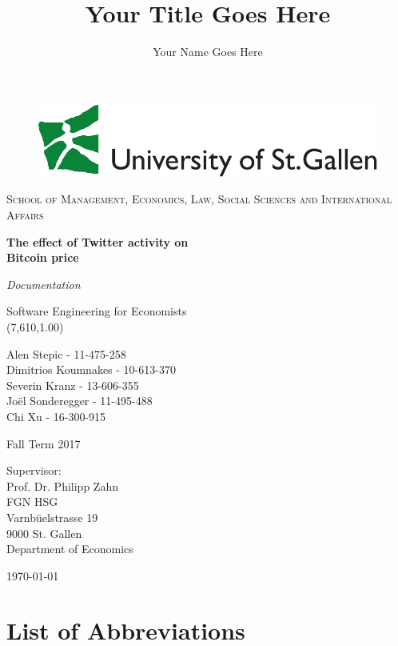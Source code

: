 \documentclass[a4paper,12pt]{article}
\title{Your Title Goes Here}
\author{Your Name Goes Here}
\begin{document}
\begin{titlepage}
	\begin{figure}
	\centering
	\includegraphics[scale=0.32]{logohsg}
	\end{figure}
\centering
\centering
{\scshape\large School of Management, Economics, Law, Social Sciences and International Affairs \par}
\vspace{1.7cm}
{\huge\bfseries The effect of Twitter activity on \\ Bitcoin price\par}
\vspace{1.0cm}
{\Huge\itshape Documentation\par}
\vspace{1.0cm}     
{\Large Software Engineering for Economists \\ (7,610,1.00) \par}
\vspace{1.2cm}
{Alen Stepic - 11-475-258 \\ Dimitrios Koumnakes - 10-613-370 \\ Severin Kranz - 13-606-355 \\ Joël Sonderegger - 11-495-488 \\ Chi Xu - 16-300-915 \par}
\vspace{1.2cm}
Fall Term 2017 \\
\vspace{1.2cm}
{Supervisor:\\ Prof. Dr. Philipp Zahn\\ FGN HSG\\ Varnbüelstrasse 19\\ 9000 St. Gallen\\ Department of Economics\par}
\vspace{0.8cm}
{\centering\today\par}
\end{titlepage}

\clearpage

\tableofcontents

\clearpage
    
\listoffigures\bigskip 
\section*{List of Abbreviations} 
\begin{acronym}[ASECRETTT]
\end{acronym}
\end{document}
